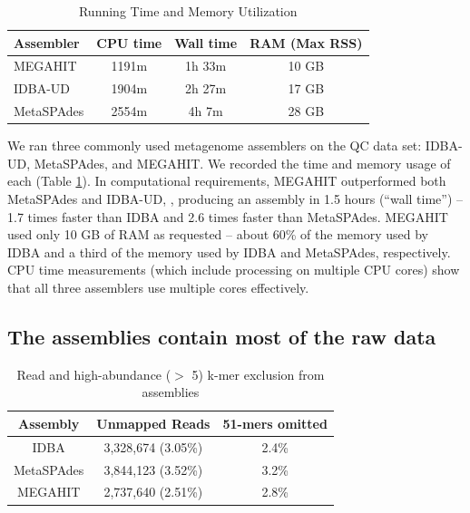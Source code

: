 \documentclass[11pt]{article}
\begin{document}
 \begin{table}[h]
\caption{Running Time and Memory Utilization}
\centering
\begin{tabular}{|l|c|c|c|}
\hline
\textbf{Assembler} & \textbf{CPU time} & \textbf{Wall time} & \textbf{RAM (Max RSS)} \\ [0.5ex]
\hline
MEGAHIT & 1191m & 1h 33m & 10 GB \\
\hline
IDBA-UD & 1904m & 2h 27m & 17 GB \\
\hline
MetaSPAdes & 2554m & 4h 7m & 28 GB \\
\hline

\end{tabular}
\label{table:time-memory}
\end{table}

We ran three commonly used metagenome assemblers on the QC data set:
IDBA-UD, MetaSPAdes, and MEGAHIT. We recorded the time and memory
usage of each (Table \ref{table:time-memory}).  In computational
requirements, MEGAHIT outperformed both MetaSPAdes and IDBA-UD, ,
producing an assembly in 1.5 hours (``wall time'') -- 1.7 times faster
than IDBA and 2.6 times faster than MetaSPAdes.  MEGAHIT used only 10
GB of RAM as requested -- about 60\% of the memory used by IDBA and a
third of the memory used by IDBA and MetaSPAdes, respectively.  CPU
time measurements (which include processing on multiple CPU cores)
show that all three assemblers use multiple cores effectively.


\subsection*{The assemblies contain most of the raw data}






\begin{table}[!h]
\centering
\caption{Read and high-abundance ($>$ 5) k-mer exclusion from assemblies}
\begin{tabular}{|c|c|c|}\hline
  \textbf{Assembly} & \textbf{Unmapped Reads} & \textbf {51-mers omitted}
  \\ \hline
IDBA &3,328,674 (3.05\%)&  2.4\% \\ \hline
MetaSPAdes &3,844,123 (3.52\%) &  3.2\% \\ \hline
MEGAHIT &2,737,640 (2.51\%) &   2.8\% \\ \hline
\end{tabular}
\label{table:reads-kmers}
\end{table}
\end{document}
